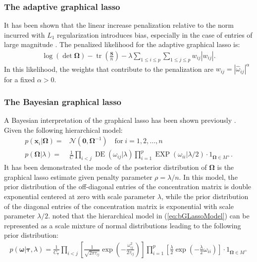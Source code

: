 \documentclass[11pt]{article}
\DeclareMathOperator{\tr}{tr}
\DeclareMathOperator{\DE}{DE}
\DeclareMathOperator{\EXP}{EXP}
\begin{document}
\subsubsection{The adaptive graphical lasso}
It has been shown that the linear increase penalization relative to the norm incurred with $L_1$ regularization introduces bias, especially in the case of entries of large magnitude \cite{fan2009,lam2009}. 
The penalized likelihood for the adaptive graphical lasso is:
\begin{align}
	\log(\det \boldsymbol{\Omega})-\tr \left(\frac{\mathbf{S}}{n}\right) - \lambda \sum_{1\leq i \leq p} \sum_{1 \leq j \leq p} w_{ij} |w_{ij}|.
\end{align}
In this likelihood, the weights that contribute to the penalization are $w_{ij}=|\hat{\omega}_{ij}|^\alpha$ for a fixed $\alpha >0$.

\subsubsection{The Bayesian graphical lasso}
A Bayesian interpretation of the graphical lasso has been shown previously \citep{wang2012}. Given the following hierarchical model:
\begin{align}
	p(\textbf{x}_i|\boldsymbol{\Omega}) =& \mathcal{N}(\textbf{0},\boldsymbol{\Omega}^{-1}) \quad \text{for} \; i=1,2,\hdots,n\\
	p(\boldsymbol{\Omega}|\lambda) =& \frac{1}{C} \prod_{i<j} \DE(\omega_{ij}|\lambda) \prod_{i=1}^{p} \EXP (\omega_{ii} | \lambda / 2) \cdot 1_{\boldsymbol{\Omega}\in M^+}.
	\label{eq:bGLassoModel}
\end{align}
It has been demonstrated the mode of the posterior distribution of $\boldsymbol{\Omega}$ is the graphical lasso estimate given penalty parameter $\rho=\lambda/n$. In this model, the prior distribution of the off-diagonal entries of the concentration matrix is double exponential centered at zero with scale parameter $\lambda$, while the prior distribution of the diagonal entries of the concentration matrix is exponential with scale parameter $\lambda/2$.   noted that the hierarchical model in (\ref{eq:bGLassoModel}) can be represented as a scale mixture of normal distributions \cite{andrews1974,west1987} leading to the following prior distribution:
\begin{align}
	p(\boldsymbol{\omega}| \boldsymbol{\tau},\lambda)=\frac{1}{C_{\boldsymbol{\tau}}} \prod_{i<j} \left[ \frac{1}{\sqrt{2\pi \tau_{ij}}} \exp \left(- \frac{\omega_{ij}^2}{2\tau_{ij}}\right) \right] \prod_{i=1}^{p} \left[\frac{\lambda}{2} \exp \left(-\frac{\lambda}{2}\omega_{ii} \right)\right] \cdot 1_{\boldsymbol{\Omega}\in M^+}
\end{align}
\end{document}
